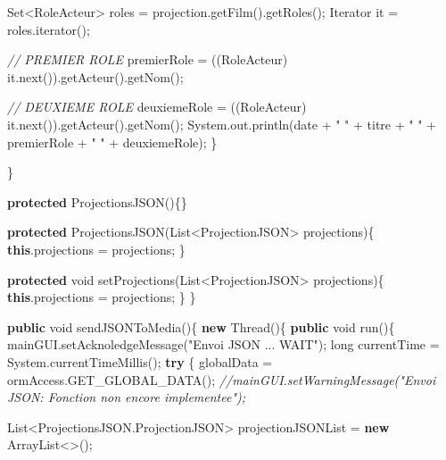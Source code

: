\documentclass[]{article}
\newenvironment{Shaded}{}{}
\newcommand{\KeywordTok}[1]{\textcolor[rgb]{0.00,0.44,0.13}{\textbf{{#1}}}}
\newcommand{\DataTypeTok}[1]{\textcolor[rgb]{0.56,0.13,0.00}{{#1}}}
\newcommand{\StringTok}[1]{\textcolor[rgb]{0.25,0.44,0.63}{{#1}}}
\newcommand{\CommentTok}[1]{\textcolor[rgb]{0.38,0.63,0.69}{\textit{{#1}}}}
\newcommand{\FunctionTok}[1]{\textcolor[rgb]{0.02,0.16,0.49}{{#1}}}
\newcommand{\BuiltInTok}[1]{{#1}}
\newcommand{\NormalTok}[1]{{#1}}
\begin{document}
\begin{Shaded}
\begin{Highlighting}[]
				\BuiltInTok{Set}\NormalTok{<RoleActeur> roles = projection.}\FunctionTok{getFilm}\NormalTok{().}\FunctionTok{getRoles}\NormalTok{();}
				\BuiltInTok{Iterator} \NormalTok{it = roles.}\FunctionTok{iterator}\NormalTok{();}

				\CommentTok{// PREMIER ROLE}
				\NormalTok{premierRole = ((RoleActeur) it.}\FunctionTok{next}\NormalTok{()).}\FunctionTok{getActeur}\NormalTok{().}\FunctionTok{getNom}\NormalTok{();}

				\CommentTok{// DEUXIEME ROLE}
				\NormalTok{deuxiemeRole = ((RoleActeur) it.}\FunctionTok{next}\NormalTok{()).}\FunctionTok{getActeur}\NormalTok{().}\FunctionTok{getNom}\NormalTok{();}
				\BuiltInTok{System}\NormalTok{.}\FunctionTok{out}\NormalTok{.}\FunctionTok{println}\NormalTok{(date + }\StringTok{" "} \NormalTok{+ titre + }\StringTok{" "} \NormalTok{+ premierRole + }
				  \StringTok{" "} \NormalTok{+ deuxiemeRole);}
			\NormalTok{\}}

		\NormalTok{\}}

		\KeywordTok{protected} \FunctionTok{ProjectionsJSON}\NormalTok{()\{\}}

		\KeywordTok{protected} \FunctionTok{ProjectionsJSON}\NormalTok{(}\BuiltInTok{List}\NormalTok{<ProjectionJSON> projections)\{}
			\KeywordTok{this}\NormalTok{.}\FunctionTok{projections} \NormalTok{= projections;}
		\NormalTok{\}}

		\KeywordTok{protected} \DataTypeTok{void} \FunctionTok{setProjections}\NormalTok{(}\BuiltInTok{List}\NormalTok{<ProjectionJSON> projections)\{}
			\KeywordTok{this}\NormalTok{.}\FunctionTok{projections} \NormalTok{= projections;}
		\NormalTok{\}}
	\NormalTok{\}}

	\KeywordTok{public} \DataTypeTok{void} \FunctionTok{sendJSONToMedia}\NormalTok{()\{}
	  \KeywordTok{new} \BuiltInTok{Thread}\NormalTok{()\{}
		\KeywordTok{public} \DataTypeTok{void} \FunctionTok{run}\NormalTok{()\{}
			\NormalTok{mainGUI.}\FunctionTok{setAcknoledgeMessage}\NormalTok{(}\StringTok{"Envoi JSON ... WAIT"}\NormalTok{);}
			\DataTypeTok{long} \NormalTok{currentTime = }\BuiltInTok{System}\NormalTok{.}\FunctionTok{currentTimeMillis}\NormalTok{();}
			\KeywordTok{try} \NormalTok{\{}
			  \NormalTok{globalData = ormAccess.}\FunctionTok{GET_GLOBAL_DATA}\NormalTok{();}
			  \CommentTok{//mainGUI.setWarningMessage("Envoi JSON: Fonction non encore implementee");}

			  \BuiltInTok{List}\NormalTok{<ProjectionsJSON.}\FunctionTok{ProjectionJSON}\NormalTok{> projectionJSONList = }\KeywordTok{new} \BuiltInTok{ArrayList}\NormalTok{<>();}


\end{Highlighting}
\end{Shaded}
\end{document}
